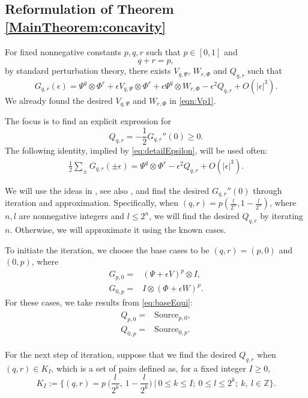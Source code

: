 \documentclass{article}
\numberwithin{equation}{section}
\begin{document}
\subsection{Reformulation of Theorem \ref{MainTheorem:concavity}}\label{subsec:concave}
For fixed nonnegative constants $p,q,r$ such that $p \in [0, 1]$ and  $$q + r = p,$$ by standard perturbation theory, there exists $V_{q,\Psi}$, $W_{r,\Phi}$ and $ Q_{q,r}$ such that
\begin{equation}\label{eq:detailEpsilon}
  G_{q, r}(\epsilon) = \Psi^q \otimes \Phi^r+\epsilon V_{q,\Psi}\otimes \Phi^r+\epsilon \Psi^q \otimes W_{r,\Phi}-\epsilon^2 Q_{q,r}+O(|\epsilon|^3). 
\end{equation} We already found the desired $V_{q,\Psi}$ and $W_{r,\Phi}$ in \eqref{eqn:Vp1}. 

The focus is to find an explicit expression for $$Q_{q,r}=-\frac{1}{2}G_{q, r}''(0)\geq 0.$$ The following identity, implied by \eqref{eq:detailEpsilon}, will be used often:
\begin{align}\label{eq:pmEpsilon}
    \frac{1}{2}\sum_{\pm}G_{q, r}(\pm\epsilon)=\Psi^q \otimes \Phi^r-\epsilon^2 Q_{q,r}+O(|\epsilon|^3).
\end{align}


We will use the ideas in \cite{ANDO1979203}, see also \cite{carlen2010trace}, and find the desired $G_{q, r}''(0)$ through iteration and approximation. Specifically, when $(q,r)=p(\frac{l}{2^n},1-\frac{l}{2^n})$, where $n,l$ are nonnegative integers and $l\leq 2^n$, we will find the desired $Q_{q,r}$ by iterating $n$. Otherwise, we will approximate it using the known cases.

To initiate the iteration, we choose the base cases to be $(q, r) = (p, 0)$ and $(0, p)$, where
\begin{align*}
G_{p, 0} =& (\Psi + \epsilon V)^p \otimes I,\\
G_{0, p} =& I \otimes (\Phi + \epsilon W)^p.
\end{align*}
For these cases, we take results from \eqref{eq:baseEqui}:
\begin{align}
\begin{split}
  Q_{p,0}=&\text{Source}_{p,0},\\
  Q_{0,p}=&\text{Source}_{0,p}.
\end{split}
\end{align}


For the next step of iteration, suppose that we find the desired $Q_{q,r}$ when $(q,r)\in K_{I}$, which is a set of pairs defined as, for a fixed integer $I \geq 0$,
\begin{equation}\label{eq:cases}
K_{I}:=\Big\{  (q, r) = p\ \big(  \frac{l}{2^k},\ 1 - \frac{l}{2^k}  \big)\ \Big| \ 0 \leq k \leq I;\ 0 \leq l \leq 2^k; \ k,\ l \in \mathbb{Z} \Big\}.
\end{equation} 
\end{document}

